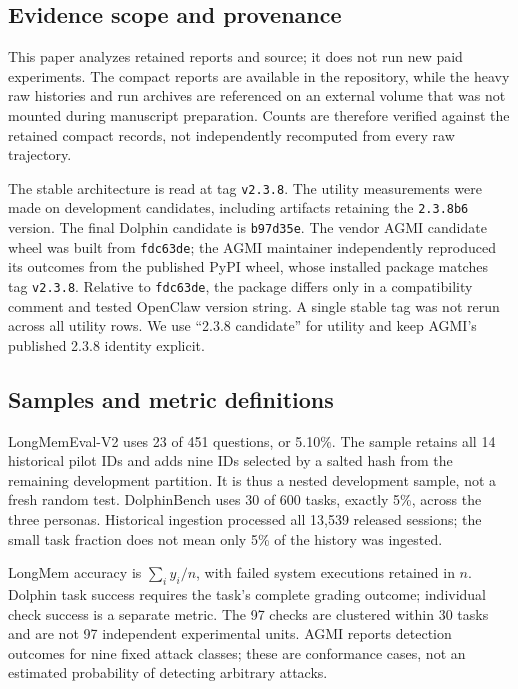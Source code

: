 \documentclass[11pt]{article}
\newcommand{\code}[1]{\texttt{\small #1}}
\begin{document}
\subsection{Evidence scope and provenance}
This paper analyzes retained reports and source; it does not run new paid experiments. The compact reports are available in the repository, while the heavy raw histories and run archives are referenced on an external volume that was not mounted during manuscript preparation. Counts are therefore verified against the retained compact records, not independently recomputed from every raw trajectory.

The stable architecture is read at tag \code{v2.3.8}. The utility measurements were made on development candidates, including artifacts retaining the \code{2.3.8b6} version. The final Dolphin candidate is \code{b97d35e}. The vendor AGMI candidate wheel was built from \code{fdc63de}; the AGMI maintainer independently reproduced its outcomes from the published PyPI wheel, whose installed package matches tag \code{v2.3.8}. Relative to \code{fdc63de}, the package differs only in a compatibility comment and tested OpenClaw version string. A single stable tag was not rerun across all utility rows. We use ``2.3.8 candidate'' for utility and keep AGMI's published 2.3.8 identity explicit.

\subsection{Samples and metric definitions}
LongMemEval-V2 uses 23 of 451 questions, or 5.10\%. The sample retains all 14 historical pilot IDs and adds nine IDs selected by a salted hash from the remaining development partition. It is thus a nested development sample, not a fresh random test. DolphinBench uses 30 of 600 tasks, exactly 5\%, across the three personas. Historical ingestion processed all 13,539 released sessions; the small task fraction does not mean only 5\% of the history was ingested.

LongMem accuracy is $\sum_i y_i/n$, with failed system executions retained in $n$. Dolphin task success requires the task's complete grading outcome; individual check success is a separate metric. The 97 checks are clustered within 30 tasks and are not 97 independent experimental units. AGMI reports detection outcomes for nine fixed attack classes; these are conformance cases, not an estimated probability of detecting arbitrary attacks.
\end{document}
